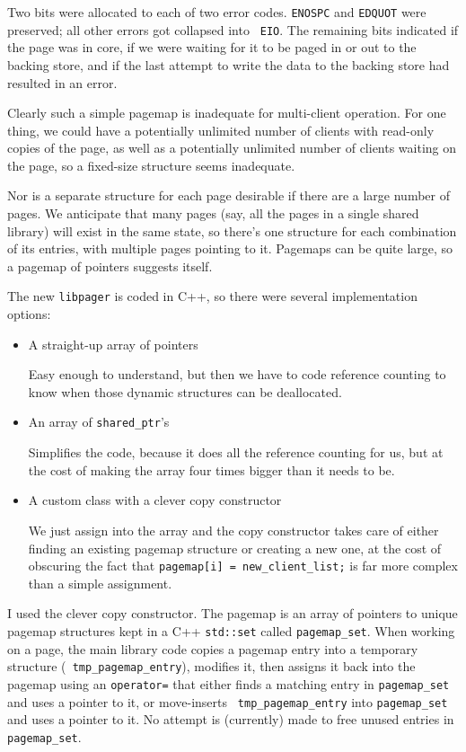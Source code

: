 \documentclass{article}
\def\libpager{{\tt libpager}\xspace}
\begin{document}
Two bits were allocated to each of two error codes.  {\tt ENOSPC} and
{\tt EDQUOT} were preserved; all other errors got collapsed into {\tt
  EIO}.  The remaining bits indicated if the page was in core, if we
were waiting for it to be paged in or out to the backing store, and if
the last attempt to write the data to the backing store had resulted
in an error.

Clearly such a simple pagemap is inadequate for multi-client
operation.  For one thing, we could have a potentially unlimited
number of clients with read-only copies of the page, as well as a
potentially unlimited number of clients waiting on the page, so
a fixed-size structure seems inadequate.

Nor is a separate structure for each page desirable if there are a
large number of pages.  We anticipate that many pages (say, all the
pages in a single shared library) will exist in the same state, so
there's one structure for each combination of its entries, with
multiple pages pointing to it.  Pagemaps can be quite large, so a
pagemap of pointers suggests itself.

The new \libpager is coded in C++, so there were several implementation options:

\begin{itemize}

\item  A straight-up array of pointers

Easy enough to understand, but then we have to
code reference counting to know when those dynamic structures can be
deallocated.

\item An array of {\tt shared_ptr}'s

Simplifies the code, because
it does all the reference counting for us, but at the cost of making
the array four times bigger than it needs to be.

\item A custom class with a clever copy constructor

We just assign into the array and the copy constructor takes care of
either finding an existing pagemap structure or creating a new one, at
the cost of obscuring the fact that {\tt pagemap[i] = new_client_list;} is
far more complex than a simple assignment.

\end{itemize}

I used the clever copy constructor.  The pagemap is an array of
pointers to unique pagemap structures kept in a C++ {\tt std::set}
called {\tt pagemap_set}.  When working on a page, the main library
code copies a pagemap entry into a temporary structure ({\tt
  tmp_pagemap_entry}), modifies it, then assigns it back into the
pagemap using an {\tt operator=} that either finds a matching entry in
{\tt pagemap_set} and uses a pointer to it, or move-inserts {\tt
  tmp_pagemap_entry} into {\tt pagemap_set} and uses a pointer to it.
No attempt is (currently) made to free unused entries in {\tt
  pagemap_set}.
\end{document}
